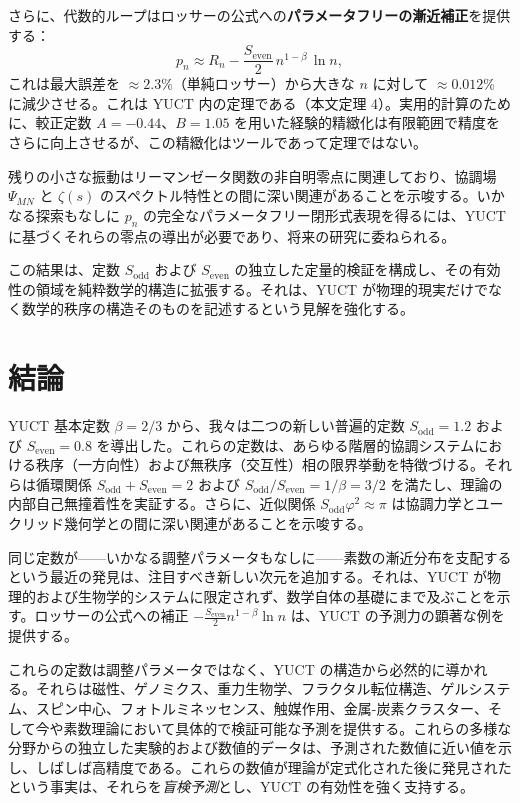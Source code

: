 \documentclass[11pt,a4paper]{article}
\begin{document}
	さらに、代数的ループはロッサーの公式への\textbf{パラメータフリーの漸近補正}を提供する：
	\[
	p_n \approx R_n - \frac{S_{\mathrm{even}}}{2}\, n^{1-\beta}\,\ln n,
	\]
	これは最大誤差を \(\approx 2.3\%\)（単純ロッサー）から大きな \(n\) に対して \(\approx 0.012\%\) に減少させる。これは YUCT 内の定理である（本文定理 4）。実用的計算のために、較正定数 \(A=-0.44\)、\(B=1.05\) を用いた経験的精緻化は有限範囲で精度をさらに向上させるが、この精緻化はツールであって定理ではない。
	
	残りの小さな振動はリーマンゼータ関数の非自明零点に関連しており、協調場 \(\Psi_{MN}\) と \(\zeta(s)\) のスペクトル特性との間に深い関連があることを示唆する。いかなる探索もなしに \(p_n\) の完全なパラメータフリー閉形式表現を得るには、YUCT に基づくそれらの零点の導出が必要であり、将来の研究に委ねられる。
	
	この結果は、定数 \(S_{\mathrm{odd}}\) および \(S_{\mathrm{even}}\) の独立した定量的検証を構成し、その有効性の領域を純粋数学的構造に拡張する。それは、YUCT が物理的現実だけでなく数学的秩序の構造そのものを記述するという見解を強化する。
	
	\section{結論}
	YUCT 基本定数 \(\beta = 2/3\) から、我々は二つの新しい普遍的定数 \(S_{\text{odd}} = 1.2\) および \(S_{\text{even}} = 0.8\) を導出した。これらの定数は、あらゆる階層的協調システムにおける秩序（一方向性）および無秩序（交互性）相の限界挙動を特徴づける。それらは循環関係 \(S_{\text{odd}}+S_{\text{even}}=2\) および \(S_{\text{odd}}/S_{\text{even}} = 1/\beta = 3/2\) を満たし、理論の内部自己無撞着性を実証する。さらに、近似関係 \(S_{\text{odd}}\varphi^2 \approx \pi\) は協調力学とユークリッド幾何学との間に深い関連があることを示唆する。
	
	同じ定数が——いかなる調整パラメータもなしに——素数の漸近分布を支配するという最近の発見は、注目すべき新しい次元を追加する。それは、YUCT が物理的および生物学的システムに限定されず、数学自体の基礎にまで及ぶことを示す。ロッサーの公式への補正 \(-\frac{S_{\text{even}}}{2}n^{1-\beta}\ln n\) は、YUCT の予測力の顕著な例を提供する。
	
	これらの定数は調整パラメータではなく、YUCT の構造から必然的に導かれる。それらは磁性、ゲノミクス、重力生物学、フラクタル転位構造、ゲルシステム、スピン中心、フォトルミネッセンス、触媒作用、金属-炭素クラスター、そして今や素数理論において具体的で検証可能な予測を提供する。これらの多様な分野からの独立した実験的および数値的データは、予測された数値に近い値を示し、しばしば高精度である。これらの数値が理論が定式化された後に発見されたという事実は、それらを\textit{盲検予測}とし、YUCT の有効性を強く支持する。
	
\end{document}
